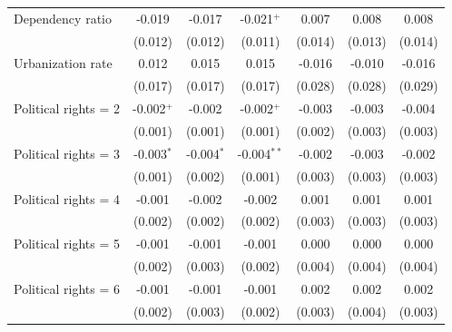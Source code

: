 \begin{table}[htbp]
\begin{tabular}{lcccccc}
      Dependency ratio           & -0.019            & -0.017            & -0.021$^{+}$      & 0.007             & 0.008             & 0.008\\   
                                 & (0.012)           & (0.012)           & (0.011)           & (0.014)           & (0.013)           & (0.014)\\   
      Urbanization rate          & 0.012             & 0.015             & 0.015             & -0.016            & -0.010            & -0.016\\   
                                 & (0.017)           & (0.017)           & (0.017)           & (0.028)           & (0.028)           & (0.029)\\   
      Political rights = 2       & -0.002$^{+}$      & -0.002            & -0.002$^{+}$      & -0.003            & -0.003            & -0.004\\   
                                 & (0.001)           & (0.001)           & (0.001)           & (0.002)           & (0.003)           & (0.003)\\   
      Political rights = 3       & -0.003$^{*}$      & -0.004$^{*}$      & -0.004$^{**}$     & -0.002            & -0.003            & -0.002\\   
                                 & (0.001)           & (0.002)           & (0.001)           & (0.003)           & (0.003)           & (0.003)\\   
      Political rights = 4       & -0.001            & -0.002            & -0.002            & 0.001             & 0.001             & 0.001\\   
                                 & (0.002)           & (0.002)           & (0.002)           & (0.003)           & (0.003)           & (0.003)\\   
      Political rights = 5       & -0.001            & -0.001            & -0.001            & 0.000             & 0.000             & 0.000\\   
                                 & (0.002)           & (0.003)           & (0.002)           & (0.004)           & (0.004)           & (0.004)\\   
      Political rights = 6       & -0.001            & -0.001            & -0.001            & 0.002             & 0.002             & 0.002\\   
                                 & (0.002)           & (0.003)           & (0.002)           & (0.003)           & (0.004)           & (0.003)\\   

\end{tabular}
\end{table}
